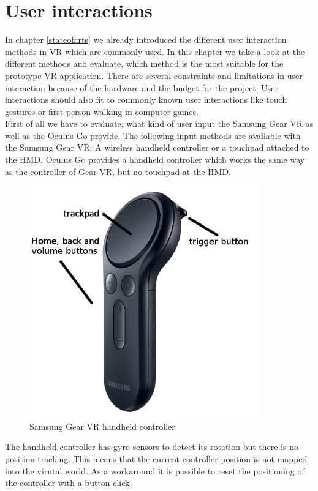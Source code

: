 \section{User interactions}
In chapter \ref{stateofarts} we already introduced the different user interaction methods in VR which are commonly used. In this chapter we take a look at the different methods and evaluate, which method is the most suitable for the prototype VR application. There are several constraints and limitations in user interaction because of the hardware and the budget for the project. User interactions should also fit to commonly known user interactions like touch gestures or first person walking in computer games.\\
First of all we have to evaluate, what kind of user input the Samsung Gear VR as well as the Oculus Go provide.
The following input methods are available with the Samsung Gear VR: A wireless handheld controller or a touchpad attached to the HMD. Oculus Go provides a handheld controller which works the same way as the controller of Gear VR, but no touchpad at the HMD.\\
\begin{figure}[h!]
  \includegraphics[width=10cm]{kapitel/samsung-controller.jpg}
  \centering
  \caption{Samsung Gear VR handheld controller \cite{Samsung.2019b}}
  \label{fig:samsung-controller}
\end{figure}
The handheld controller has gyro-sensors to detect its rotation but there is no position tracking. This means that the current controller  position is not mapped into the virutal world. As a workaround it is possible to reset the positioning of the controller with a button click.
